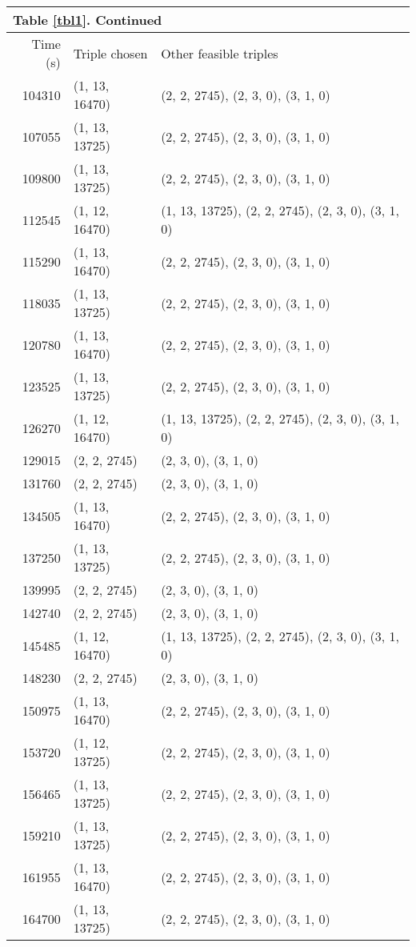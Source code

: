 \begin{table}[h!t!]
\begin{tabularx}{6.5 in}{r l X}
\multicolumn{3}{l}{Table \ref{tbl1}. Continued}\\%
\hline {{Time (s)}} & {{Triple chosen}} & {{Other feasible triples}} \\ \hline
104310 & (1, 13, 16470) & (2, 2, 2745), (2, 3, 0), (3, 1, 0) \\
107055 & (1, 13, 13725) & (2, 2, 2745), (2, 3, 0), (3, 1, 0) \\
109800 & (1, 13, 13725) & (2, 2, 2745), (2, 3, 0), (3, 1, 0) \\
112545 & (1, 12, 16470) & (1, 13, 13725), (2, 2, 2745), (2, 3, 0), (3, 1, 0) \\
115290 & (1, 13, 16470) & (2, 2, 2745), (2, 3, 0), (3, 1, 0) \\
118035 & (1, 13, 13725) & (2, 2, 2745), (2, 3, 0), (3, 1, 0) \\
120780 & (1, 13, 16470) & (2, 2, 2745), (2, 3, 0), (3, 1, 0) \\
123525 & (1, 13, 13725) & (2, 2, 2745), (2, 3, 0), (3, 1, 0) \\
126270 & (1, 12, 16470) & (1, 13, 13725), (2, 2, 2745), (2, 3, 0), (3, 1, 0) \\
129015 & (2, 2, 2745) & (2, 3, 0), (3, 1, 0) \\
131760 & (2, 2, 2745) & (2, 3, 0), (3, 1, 0) \\
134505 & (1, 13, 16470) & (2, 2, 2745), (2, 3, 0), (3, 1, 0) \\
137250 & (1, 13, 13725) & (2, 2, 2745), (2, 3, 0), (3, 1, 0) \\
139995 & (2, 2, 2745) & (2, 3, 0), (3, 1, 0) \\
142740 & (2, 2, 2745) & (2, 3, 0), (3, 1, 0) \\
145485 & (1, 12, 16470) & (1, 13, 13725), (2, 2, 2745), (2, 3, 0), (3, 1, 0)\\%
148230 & (2, 2, 2745) & (2, 3, 0), (3, 1, 0) \\
150975 & (1, 13, 16470) & (2, 2, 2745), (2, 3, 0), (3, 1, 0) \\
153720 & (1, 12, 13725) & (2, 2, 2745), (2, 3, 0), (3, 1, 0) \\
156465 & (1, 13, 13725) & (2, 2, 2745), (2, 3, 0), (3, 1, 0) \\
159210 & (1, 13, 13725) & (2, 2, 2745), (2, 3, 0), (3, 1, 0) \\
161955 & (1, 13, 16470) & (2, 2, 2745), (2, 3, 0), (3, 1, 0) \\
164700 & (1, 13, 13725) & (2, 2, 2745), (2, 3, 0), (3, 1, 0) \\

\end{tabularx}
\end{table}
